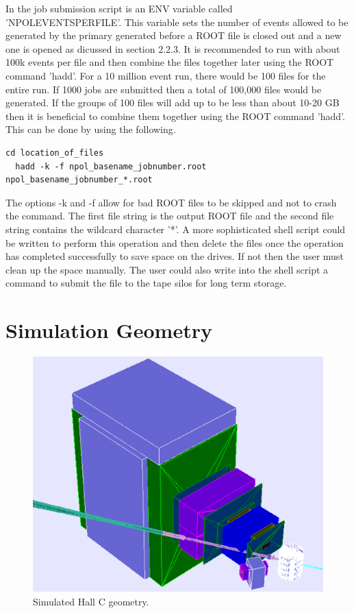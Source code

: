 \documentclass[10pt,titlepage]{article}
\begin{document}
In the job submission script is an ENV variable called 'NPOLEVENTSPERFILE'. This variable sets the number of events allowed to be generated by the primary generated before a ROOT file is closed out and a new one is opened as dicussed in section 2.2.3.  It is recommended to run with about 100k events per file and then combine the files together later using the ROOT command 'hadd'.  For a 10 million event run, there would be 100 files for the entire run.  If 1000 jobs are submitted then a total of 100,000 files would be generated.  If the groups of 100 files will add up to be less than about 10-20 GB then it is beneficial to combine them together using the ROOT command 'hadd'. This can be done by using the following.
\begin{lstlisting}[frame=single]
  cd location_of_files
  hadd -k -f npol_basename_jobnumber.root npol_basename_jobnumber_*.root
\end{lstlisting}
The options -k and -f allow for bad ROOT files to be skipped and not to crash the command. The first file string is the output ROOT file and the second file string contains the wildcard character '*'.  A more sophisticated shell script could be written to perform this operation and then delete the files once the operation has completed successfully to save space on the drives.  If not then the user must clean up the space manually.  The user could also write into the shell script a command to submit the file to the tape silos for long term storage. \\

\section{Simulation Geometry}

\begin{figure}[ht]
  \includegraphics[scale=0.5]{figures/geometry}
\caption{Simulated Hall C geometry.}
\label{fig:geometry}
\end{figure}
\end{document}
